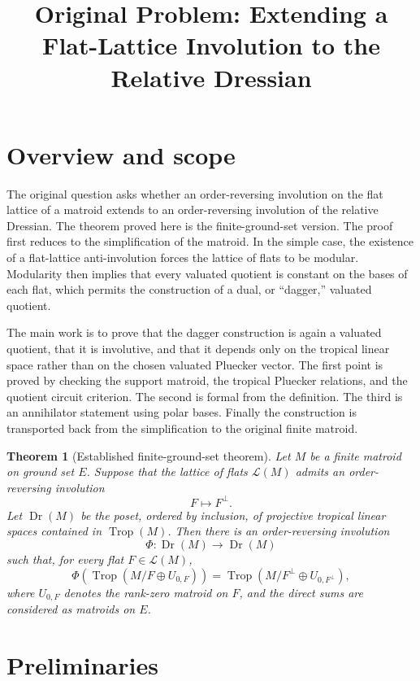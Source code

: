 \documentclass[12pt]{article}
\title{Original Problem: Extending a Flat-Lattice Involution to the Relative Dressian}
\author{}
\date{}
\newtheorem{theorem}{Theorem}
\theoremstyle{definition}
\newcommand{\Trop}{\operatorname{Trop}}
\newcommand{\Dr}{\operatorname{Dr}}
\newcommand{\cL}{\mathcal L}
\begin{document}
\maketitle

\section*{Overview and scope}

The original question asks whether an order-reversing involution on the flat lattice of a matroid extends to an order-reversing involution of the relative Dressian.  The theorem proved here is the finite-ground-set version.  The proof first reduces to the simplification of the matroid.  In the simple case, the existence of a flat-lattice anti-involution forces the lattice of flats to be modular.  Modularity then implies that every valuated quotient is constant on the bases of each flat, which permits the construction of a dual, or ``dagger,'' valuated quotient.

The main work is to prove that the dagger construction is again a valuated quotient, that it is involutive, and that it depends only on the tropical linear space rather than on the chosen valuated Pluecker vector.  The first point is proved by checking the support matroid, the tropical Pluecker relations, and the quotient circuit criterion.  The second is formal from the definition.  The third is an annihilator statement using polar bases.  Finally the construction is transported back from the simplification to the original finite matroid.

\begin{theorem}[Established finite-ground-set theorem]\label{thm:main}
Let \(M\) be a finite matroid on ground set \(E\).  Suppose that the lattice of flats \(\cL(M)\) admits an order-reversing involution
\[
F\longmapsto F^\perp .
\]
Let \(\Dr(M)\) be the poset, ordered by inclusion, of projective tropical linear spaces contained in \(\Trop(M)\).  Then there is an order-reversing involution
\[
\Phi:\Dr(M)\longrightarrow \Dr(M)
\]
such that, for every flat \(F\in \cL(M)\),
\[
\Phi\!\left(\Trop(M/F\oplus U_{0,F})\right)
=
\Trop(M/F^\perp\oplus U_{0,F^\perp}),
\]
where \(U_{0,F}\) denotes the rank-zero matroid on \(F\), and the direct sums are considered as matroids on \(E\).
\end{theorem}

\section*{Preliminaries}
\end{document}
